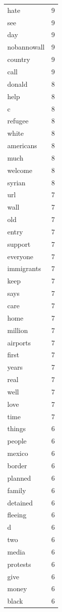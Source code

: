 \begin{tabular}{lr}
hate & 9 \\
see & 9 \\
day & 9 \\
nobannowall & 9 \\
country & 9 \\
call & 9 \\
donald & 8 \\
help & 8 \\
c & 8 \\
refugee & 8 \\
white & 8 \\
americans & 8 \\
much & 8 \\
welcome & 8 \\
syrian & 8 \\
url & 7 \\
wall & 7 \\
old & 7 \\
entry & 7 \\
support & 7 \\
everyone & 7 \\
immigrants & 7 \\
keep & 7 \\
says & 7 \\
care & 7 \\
home & 7 \\
million & 7 \\
airports & 7 \\
first & 7 \\
years & 7 \\
real & 7 \\
well & 7 \\
love & 7 \\
time & 7 \\
things & 6 \\
people & 6 \\
mexico & 6 \\
border & 6 \\
planned & 6 \\
family & 6 \\
detained & 6 \\
fleeing & 6 \\
d & 6 \\
two & 6 \\
media & 6 \\
protests & 6 \\
give & 6 \\
money & 6 \\
black & 6 \\

\end{tabular}
